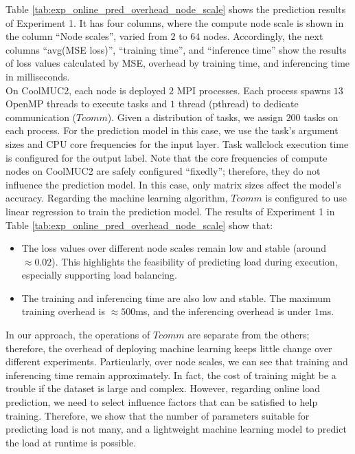 Table \ref{tab:exp_online_pred_overhead_node_scale} shows the prediction results of Experiment 1. It has four columns, where the compute node scale is shown in the column ``Node scales'', varied from $2$ to $64$ nodes. Accordingly, the next columns ``avg(MSE loss)'', ``training time'', and ``inference time'' show the results of loss values calculated by MSE, overhead by training time, and inferencing time in milliseconds.\\

On CoolMUC2, each node is deployed $2$ MPI processes. Each process spawns $13$ OpenMP threads to execute tasks and $1$ thread (pthread) to dedicate communication ($Tcomm$). Given a distribution of tasks, we assign $200$ tasks on each process. For the prediction model in this case, we use the task's argument sizes and CPU core frequencies for the input layer. Task wallclock execution time is configured for the output label. Note that the core frequencies of compute nodes on CoolMUC2 are safely configured ``fixedly''; therefore, they do not influence the prediction model. In this case, only matrix sizes affect the model's accuracy. Regarding the machine learning algorithm, $Tcomm$ is configured to use linear regression to train the prediction model. The results of Experiment 1 in Table \ref{tab:exp_online_pred_overhead_node_scale} show that:
\begin{itemize}
	\item The loss values over different node scales remain low and stable (around $\approx 0.02$). This highlights the feasibility of predicting load during execution, especially supporting load balancing.
	\item The training and inferencing time are also low and stable. The maximum training overhead is $\approx 500$ms, and the inferencing overhead is under $1$ms.
\end{itemize}
  
In our approach, the operations of $Tcomm$ are separate from the others; therefore, the overhead of deploying machine learning keeps little change over different experiments. Particularly, over node scales, we can see that training and inferencing time remain approximately. In fact, the cost of training might be a trouble if the dataset is large and complex. However, regarding online load prediction, we need to select influence factors that can be satisfied to help training. Therefore, we show that the number of parameters suitable for predicting load is not many, and a lightweight machine learning model to predict the load at runtime is possible.\\

